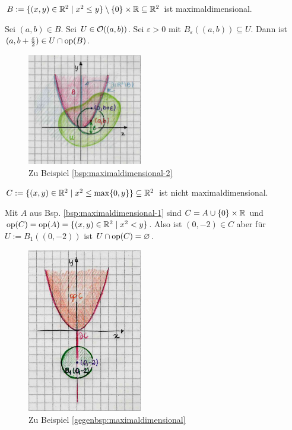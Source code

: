     \begin{bsp}\label{bsp:maximaldimensional-2}
        $B := \{(x,y) \in \mathbb{R}^2 \mid x^2 \leq y\} \setminus \{0\} \times \mathbb{R} \subseteq \mathbb{R}^2$ ist maximaldimensional.
    \end{bsp}
    \begin{bew}
        Sei $(a,b) \in B$. Sei $U \in \mathcal{O}((a,b))$. Sei $\varepsilon > 0$ mit $B_\varepsilon((a,b)) \subseteq U$. Dann ist $(a,b+\frac{\varepsilon}{2}) \in U \cap \text{op}(B)$.
    \end{bew}

    
    \begin{figure}[ht]
        \centering
        \includegraphics[width=5cm]{gfx/maxdim-2.png}
        \caption{Zu Beispiel \ref{bsp:maximaldimensional-2}}
        \label{fig:maxdim-2}
    \end{figure}

    \begin{gegenbsp}\label{gegenbsp:maximaldimensional}
        $C := \{(x,y) \in \mathbb{R}^2 \mid x^2 \leq \max\{0,y\}\} \subseteq \mathbb{R}^2$ ist nicht maximaldimensional.
    \end{gegenbsp}
    \begin{bew}
        Mit $A$ aus Bsp. \ref{bsp:maximaldimensional-1} sind $C = A \cup \{0\} \times \mathbb{R}$ und $\text{op}(C) = \text{op}(A) = \{(x,y) \in \mathbb{R}^2 \mid x^2 < y\}$. Also ist $(0,-2) \in C$ aber für $U := B_1((0,-2))$ ist $U \cap \text{op}(C) = \varnothing$.
    \end{bew}

    
    \begin{figure}[ht]
        \centering
        \includegraphics[width=5cm]{gfx/nicht-maxdim.png}
        \caption{Zu Beispiel \ref{gegenbsp:maximaldimensional}}
        \label{fig:nicht-maxdim}
    \end{figure}

